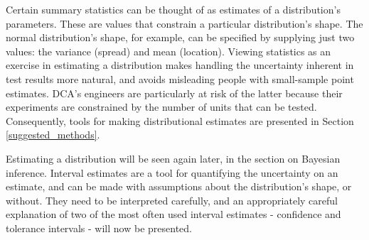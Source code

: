 \documentclass[11pt,a4paper,article]{memoir} %
\begin{document}
Certain summary statistics can be thought of as estimates of a distribution's parameters. These are values that constrain a particular distribution's shape. The normal distribution's shape, for example, can be specified by supplying just two values: the variance (spread) and mean (location). Viewing statistics as an exercise in estimating a distribution makes handling the uncertainty inherent in test results more natural, and avoids misleading people with small-sample point estimates. DCA's engineers are particularly at risk of the latter because their experiments are constrained by the number of units that can be tested. Consequently, tools for making distributional estimates are presented in Section \ref{suggested_methods}.

 Estimating a distribution will be seen again later, in the section on Bayesian inference. Interval estimates are a tool for quantifying the uncertainty on an estimate, and can be made with assumptions about the distribution's shape, or without. They need to be interpreted carefully, and an appropriately careful explanation of two of the most often used interval estimates - confidence and tolerance intervals - will now be presented.

\par

\newpage
\end{document}
